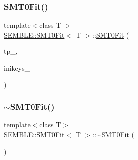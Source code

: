 \mbox{\label{structSEMBLE_1_1SMT0Fit_a048a03a78f499dc1186691afc5ff770d}} 
\subsubsection{\texorpdfstring{SMT0Fit()}{SMT0Fit()}\hspace{0.1cm}{\footnotesize\ttfamily [4/8]}}
{\footnotesize\ttfamily template$<$class T $>$ \\
\mbox{\hyperlink{structSEMBLE_1_1SMT0Fit}{S\+E\+M\+B\+L\+E\+::\+S\+M\+T0\+Fit}}$<$ T $>$\+::\mbox{\hyperlink{structSEMBLE_1_1SMT0Fit}{S\+M\+T0\+Fit}} (\begin{DoxyParamCaption}\item[{const typename std\+::vector$<$ \mbox{\hyperlink{structSEMBLE_1_1SembleMatrix}{Semble\+Matrix}}$<$ T $>$ $>$ \&}]{tp\+\_\+,  }\item[{const Fit\+Ini\+Props\+\_\+t \&}]{inikeys\+\_\+ }\end{DoxyParamCaption})}

\mbox{\label{structSEMBLE_1_1SMT0Fit_af661fa33d8fba83dbbc1f08f4c15c04e}} 
\subsubsection{\texorpdfstring{$\sim$SMT0Fit()}{~SMT0Fit()}\hspace{0.1cm}{\footnotesize\ttfamily [1/2]}}
{\footnotesize\ttfamily template$<$class T$>$ \\
\mbox{\hyperlink{structSEMBLE_1_1SMT0Fit}{S\+E\+M\+B\+L\+E\+::\+S\+M\+T0\+Fit}}$<$ T $>$\+::$\sim$\mbox{\hyperlink{structSEMBLE_1_1SMT0Fit}{S\+M\+T0\+Fit}} (\begin{DoxyParamCaption}\item[{void}]{ }\end{DoxyParamCaption})\hspace{0.3cm}{\ttfamily [inline]}}

\mbox{\label{structSEMBLE_1_1SMT0Fit_a7fe742a611df3fc26dfde896488115e8}} 
